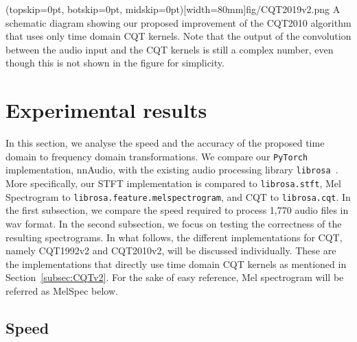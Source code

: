 \documentclass{ieeeaccess}
\newcommand{\nbh}[1]{\texttt{#1}}
\begin{document}
\Figure(topskip=0pt, botskip=0pt, midskip=0pt)[width=80mm]{fig/CQT2019v2.png}
{A schematic diagram showing our proposed improvement of the CQT2010 algorithm that uses only time domain CQT kernels. Note that the output of the convolution between the audio input and the CQT kernels is still a complex number, even though this is not shown in the figure for simplicity. \label{fig: CQT2010v2}}



\section{Experimental results}\label{sec: Result}
In this section, we analyse the speed and the accuracy of the proposed time domain to frequency domain transformations. We compare our \nbh{PyTorch} implementation, nnAudio, with the existing audio processing library \nbh{librosa}~\cite{mcfee2015Librosa}. More specifically, our STFT implementation is compared to \nbh{librosa.stft}, Mel Spectrogram to \nbh{librosa.feature.melspectrogram}, and CQT to \nbh{librosa.cqt}. In the first subsection, we compare the speed required to  process 1,770 audio files in wav format. In the second subsection, we focus on testing the correctness of the resulting spectrograms.  In what follows, the different implementations for CQT,  namely CQT1992v2 and CQT2010v2, will be discussed individually. These are the implementations that directly use time domain CQT kernels as mentioned in Section~\ref{subsec:CQTv2}. For the sake of easy reference, Mel spectrogram will be referred as MelSpec below.



\subsection{Speed}\label{subsec: speed}
\end{document}
